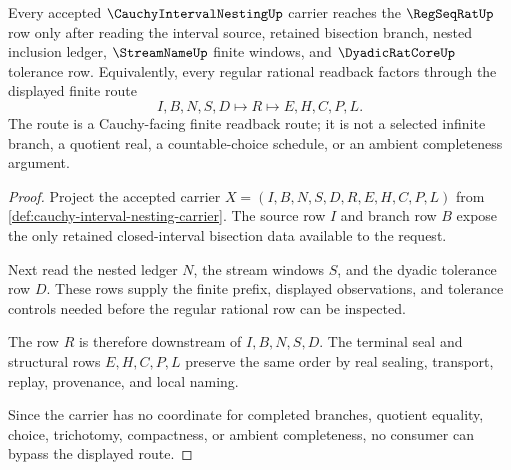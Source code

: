 \begin{theorem}
\label{thm:cauchy-interval-nesting-regseqrat-route}
Every accepted $\CauchyIntervalNestingUp$ carrier reaches the $\RegSeqRatUp$ row only after reading the interval source, retained bisection branch, nested inclusion ledger, $\StreamNameUp$ finite windows, and $\DyadicRatCoreUp$ tolerance row. Equivalently, every regular rational readback factors through the displayed finite route
$$
I,B,N,S,D \longmapsto R \longmapsto E,H,C,P,L .
$$
The route is a Cauchy-facing finite readback route; it is not a selected infinite branch, a quotient real, a countable-choice schedule, or an ambient completeness argument.
\end{theorem}
\begin{proof}
Project the accepted carrier $X=(I,B,N,S,D,R,E,H,C,P,L)$ from \autoref{def:cauchy-interval-nesting-carrier}. The source row $I$ and branch row $B$ expose the only retained closed-interval bisection data available to the request.

Next read the nested ledger $N$, the stream windows $S$, and the dyadic tolerance row $D$. These rows supply the finite prefix, displayed observations, and tolerance controls needed before the regular rational row can be inspected.

The row $R$ is therefore downstream of $I,B,N,S,D$. The terminal seal and structural rows $E,H,C,P,L$ preserve the same order by real sealing, transport, replay, provenance, and local naming.

Since the carrier has no coordinate for completed branches, quotient equality, choice, trichotomy, compactness, or ambient completeness, no consumer can bypass the displayed route.
\end{proof}

